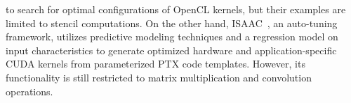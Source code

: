 to search for optimal configurations of OpenCL kernels, but
their examples are limited to stencil computations. On the other hand, 
ISAAC~\cite{10.1145/3126908.3126939}, an auto-tuning framework, utilizes 
predictive modeling techniques and a regression model on input characteristics 
to generate optimized hardware and application-specific CUDA kernels from 
parameterized PTX code templates. However, its functionality is still restricted 
to matrix multiplication and convolution operations.

